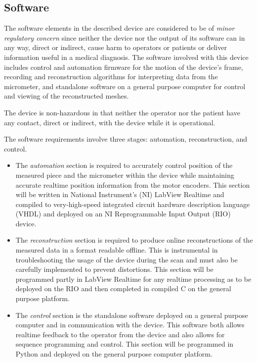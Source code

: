 \documentclass{article}
\begin{document}




\subsection{Software}

The software elements in the described device are considered to be of
\textit{minor regulatory concern} since neither the device nor the
output of its software can in any way, direct or indirect, cause harm
to operators or patients or deliver information useful in a medical
diagnosis. The software involved with this device includes control and
automation firmware for the motion of the device's frame, recording
and reconstruction algorithms for interpreting data from the
micrometer, and standalone software on a general purpose computer for
control and viewing of the reconstructed meshes.

The device is non-hazardous in that neither the operator nor the
patient have any contact, direct or indirect, with the device while it
is operational.

The software requirements involve three stages: automation,
reconstruction, and control. 

\begin{itemize}
\item The \textit{automation} section is required to accurately
  control position of the measured piece and the micrometer within the
  device while maintaining accurate realtime position information from
  the motor encoders. This section will be written in National
  Instrument's (NI) LabView Realtime and compiled to very-high-speed
  integrated circuit hardware description language (VHDL) and deployed
  on an NI Reprogrammable Input Output (RIO) device.
\item The \textit{reconstruction} section is required to produce
  online reconstructions of the measured data in a format readable
  offline. This is instrumental in troubleshooting the usage of the
  device during the scan and must also be carefully implemented to
  prevent distortions. This section will be programmed partly in
  LabView Realtime for any realtime processing as to be deployed on
  the RIO and then completed in compiled C on the general purpose
  platform.
\item The \textit{control} section is the standalone software deployed
  on a general purpose computer and in communication with the
  device. This software both allows realtime feedback to the operator
  from the device and also allows for sequence programming and
  control. This section will be programmed in Python and deployed on
  the general purpose computer platform.
\end{itemize}
\end{document}

